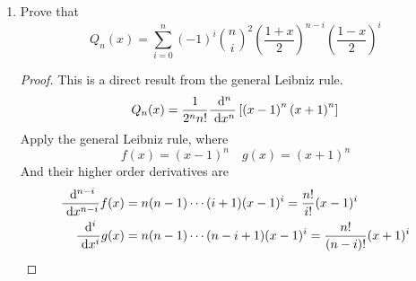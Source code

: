 \begin{enumerate}
\begin{proof}
	Apply the substitution to get
	\begin{align*}
	(n+1)Q_{n+1}(x)&=\frac{n+1}{2^{n}n!}x\D{n}{x}\left[\left(x^2-1\right)^{n}\right]+\frac{n+1}{2^{n}n!}n\D{n-1}{x}\left[\left(x^2-1\right)^{n}\right]\\
	&=x(n+1)Q_n(x)+\frac{n(n+1)}{2^{n}n!}\D{n-1}{x}\left[\left(x^2-1\right)^{n}\right]\\
	&=x(2n+1)Q_n(x)-nxQ_n(x)-\frac{n}{2^n n!}x\D{n}{x}\left[\left(x^2-1\right)^{n}\right]
	\end{align*}
	The last term without its coefficient is already in (***), so
	\[ x\D{n}{x}\left[\left(x^2-1\right)^{n}\right]=\D{n}{x}\left[x\left(x^2-1\right)^{n}\right]-n\D{n-1}{x}\left[\left(x^2-1\right)^{n}\right] \]
	Apply substitution,
	\begin{align*}
	(n+1)Q_{n+1}(x)&=x(2n+1)Q_n(x)+\frac{n+1}{2^n (n-1)!}\D{n-1}{x}\left[\left(x^2-1\right)^{n}\right]\\
	&-\frac{n}{2^n n!}\D{n}{x}\left[x\left(x^2-1\right)^{n}\right]+\frac{n}{2^n n!}\D{n-1}{x}\left[n\left(x^2-1\right)^{n}\right]\\
	&=x(2n+1)Q_n(x)+\frac{1}{2^n(n-1)!}\\
	&\cdot\D{n-1}{x}\left\{(n-1)\left(x^2-1\right)^{n}-\frac{\ud}{\ud x}\left[x\left(x^2-1\right)^{n}\right]+n\left(x^2-1\right)^{n} \right\}\\
	&=x(2n+1)Q_n(x)\\
	&+\frac{1}{2^n(n-1)!}\D{n-1}{x}\left[2n\left(x^2-1\right)\left(x^2-1\right)^{n-1}-2x^2n\left(x^2-1\right)^{n-1} \right]\\
	&=x(2n+1)Q_n(x)-\frac{2n}{2^n(n-1)!}\D{n-1}{x}\left[\left(x^2-1\right)^{n}\right]\\
	&=x(2n+1)Q_n(x)-nQ_{n-1}(x)
	\end{align*}
	This proves the recurrence relation of Legendre polynomials.
	\end{proof}
	\item Prove that
	\[ Q_n(x)=\sum_{i=0}^{n}(-1)^i \binom{n}{i}^2 \left(\frac{1+x}{2}\right)^{n-i} \left(\frac{1-x}{2}\right)^{i} \]
	\begin{proof}
	This is a direct result from the general Leibniz rule.
	\[ Q_n(x)=\frac{1}{2^nn!}\frac{~\mathrm{d}^{n}}{~\mathrm{d}{x}^{n}}\left[\left(x-1\right)^n\left(x+1\right)^n\right] \]
	Apply the general Leibniz rule, where
	\[ f(x)=(x-1)^n \quad g(x)=(x+1)^n \]
	And their higher order derivatives are
	\begin{align*}
	\D{n-i}{x}f(x)&=n(n-1)\cdots(i+1)(x-1)^i=\frac{n!}{i!}(x-1)^i\\
	\D{i}{x}g(x)&=n(n-1)\cdots(n-i+1)(x-1)^i=\frac{n!}{(n-i)!}(x+1)^i

\end{align*}
\end{proof}
\end{enumerate}
